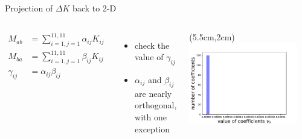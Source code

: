 \documentclass[15pt]{beamer}
\begin{document}
\begin{frame}{Projection of $\Delta K$ back to 2-D}
\begin{columns}
\begin{align*}
M_{ab} &= \sum_{i=1,j=1}^{11,11} \alpha_{ij}K_{ij}\\
M_{ba} &= \sum_{i=1,j=1}^{11,11} \beta_{ij}K_{ij}\\
\gamma_{ij} &= \alpha_{ij}\beta_{ij}
\end{align*}

\begin{itemize}
	\item check the value of $\gamma_{ij}$
	\item $\alpha_{ij}$ and $\beta_{ij}$ are nearly orthogonal, with one exception 
\end{itemize}
	
	\begin{textblock*}{8cm}(5.5cm,2cm) %
	 \includegraphics[width=0.9\textwidth]{parameter_check}
	\end{textblock*}
\end{columns}
\end{frame}
\end{document}
